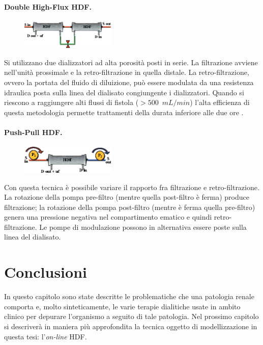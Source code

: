 \paragraph{Double High-Flux HDF.}
\begin{figure}
	\centering
	\vspace{-10pt}
		\includegraphics[width=0.40\textwidth]{immagini/doubleHDF.eps}
		\vspace{-20pt}
\end{figure}
Si utilizzano due dializzatori ad alta porosità posti in serie. La filtrazione avviene nell'unità prossimale e la retro-filtrazione in quella distale. La retro-filtrazione, ovvero la portata del fluido di diluizione, può essere modulata da una resistenza idraulica posta sulla linea del dialisato congiungente i dializzatori. Quando si riescono a raggiungere alti flussi di fistola ($>500$~$mL/min$) l'alta efficienza di questa metodologia permette trattamenti della durata inferiore alle due ore \cite{miller}.


\paragraph{Push-Pull HDF.}
\begin{figure}
	\centering
		\includegraphics[width=0.40\textwidth]{immagini/pushpull.eps}
		\vspace{-20pt}
\end{figure}
Con questa tecnica è possibile variare il rapporto fra filtrazione e retro-filtrazione. La rotazione della pompa pre-filtro (mentre quella post-filtro è ferma) produce filtrazione; la rotazione della pompa post-filtro (mentre è ferma quella pre-filtro) genera una pressione negativa nel compartimento ematico e quindi retro-filtrazione. Le pompe di modulazione possono in alternativa essere poste sulla linea del dialisato.

\section{Conclusioni}
In questo capitolo sono state descritte le problematiche che una patologia renale comporta e, molto sinteticamente, le varie terapie dialitiche usate in ambito clinico per depurare l'organismo a seguito di tale patologia. Nel prossimo capitolo si descriverà in maniera più approfondita la tecnica oggetto di modellizzazione in questa tesi: l'\textit{on-line} HDF.